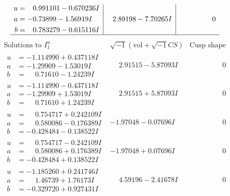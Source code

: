 \documentclass[1p]{elsarticle_modified}
\theoremstyle{definition}
\newcommand{\I}{\sqrt{-1}}
\begin{document}
$$\begin{array}{c|c|c}
\begin{aligned}
u &= \phantom{-}0.991101 - 0.670236 I \\
a &= -0.73899 - 1.56919 I \\
b &= \phantom{-}0.783279 - 0.615116 I\end{aligned}
 & \phantom{-}2.89198 - 7.70265 I & \phantom{-0.000000 } 0\\
 \hline 
 \end{array}$$\newpage$$\begin{array}{c|c|c}  
\text{Solutions to }I^u_{1}& \I (\text{vol} + \sqrt{-1}CS) & \text{Cusp shape}\\
 \hline 
\begin{aligned}
u &= -1.114990 + 0.437118 I \\
a &= -1.29909 - 1.53019 I \\
b &= \phantom{-}0.71610 - 1.24239 I\end{aligned}
 & \phantom{-}2.91515 - 5.87093 I & \phantom{-0.000000 } 0 \\ \hline\begin{aligned}
u &= -1.114990 - 0.437118 I \\
a &= -1.29909 + 1.53019 I \\
b &= \phantom{-}0.71610 + 1.24239 I\end{aligned}
 & \phantom{-}2.91515 + 5.87093 I & \phantom{-0.000000 } 0 \\ \hline\begin{aligned}
u &= \phantom{-}0.754717 + 0.242109 I \\
a &= \phantom{-}0.580086 - 0.176389 I \\
b &= -0.428484 - 0.138522 I\end{aligned}
 & -1.97048 - 0.07696 I & \phantom{-0.000000 } 0 \\ \hline\begin{aligned}
u &= \phantom{-}0.754717 - 0.242109 I \\
a &= \phantom{-}0.580086 + 0.176389 I \\
b &= -0.428484 + 0.138522 I\end{aligned}
 & -1.97048 + 0.07696 I & \phantom{-0.000000 } 0 \\ \hline\begin{aligned}
u &= -1.185260 + 0.241746 I \\
a &= \phantom{-}1.46739 + 1.76173 I \\
b &= -0.329720 + 0.927431 I\end{aligned}
 & \phantom{-}4.59196 - 2.41678 I & \phantom{-0.000000 } 0 \\ \hline\begin{aligned}

\end{aligned}
\end{array}$$
\end{document}
